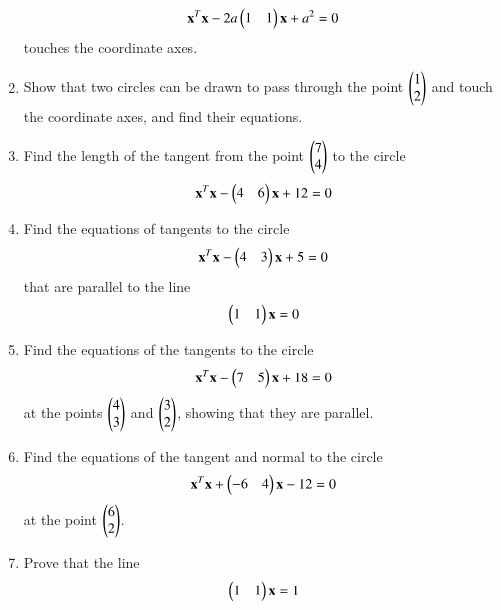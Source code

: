 \begin{enumerate}[label=\arabic*.,ref=\thesubsection.\theenumi]
\begin{align}
\mathbf{x}^T\mathbf{x}-2a\begin{pmatrix}1 & 1\end{pmatrix}\mathbf{x}+a^2 = 0
\label{eq:solutions/4/2/5/eq1}
\end{align}
touches the coordinate axes.
\solution

\item Show that two circles can be drawn to pass through the point $\begin{pmatrix}1\\2\end{pmatrix}$ and touch the coordinate axes, and find their equations.
\solution

\item Find the length of the tangent from the point $\begin{pmatrix}7\\4\end{pmatrix}$ to the circle
\begin{align}
		 \mathbf{x}^T\mathbf{x}- \begin{pmatrix}4 & 6\end{pmatrix}\mathbf{x}+12=0\label{eq:solutions/4/2/7/eq:1}
\end{align}
\solution

\item  Find the equations of tangents to the circle 
\begin{align}
\mathbf{x}^T\mathbf{x}-\begin{pmatrix}4 & 3\end{pmatrix}\mathbf{x}+5 = 0 \label{eq:solutions/4/2/8/given_circle_eq}
\end{align}
that are parallel to the line
\begin{align}
\begin{pmatrix}1 &1\end{pmatrix}\mathbf{x}=0 \label{eq:solutions/4/2/8/given_line_eq}
\end{align}
%
\solution

\renewcommand{\theequation}{\theenumi}
\item Find the equations of the tangents to the circle
\begin{align}
\mathbf{x}^T\mathbf{x}-\begin{pmatrix}7 & 5\end{pmatrix}\mathbf{x}+18 = 0
\end{align}
at the points $\begin{pmatrix}4\\3\end{pmatrix}$ and $\begin{pmatrix}3\\2\end{pmatrix}$, showing that they are parallel.
\\
\solution

\item Find the equations of the tangent and normal to the circle
\begin{align}
\mathbf{x}^T\mathbf{x}+\begin{pmatrix}-6 & 4\end{pmatrix}\mathbf{x}-12 = 0
\end{align}
at the point $\begin{pmatrix}6\\2\end{pmatrix}$.
\item Prove that the line
\begin{align}
\begin{pmatrix}1 & 1\end{pmatrix}\mathbf{x} = 1 \label{eq:solutions/4/2/11eq:1}
\end{align}

\end{enumerate}
